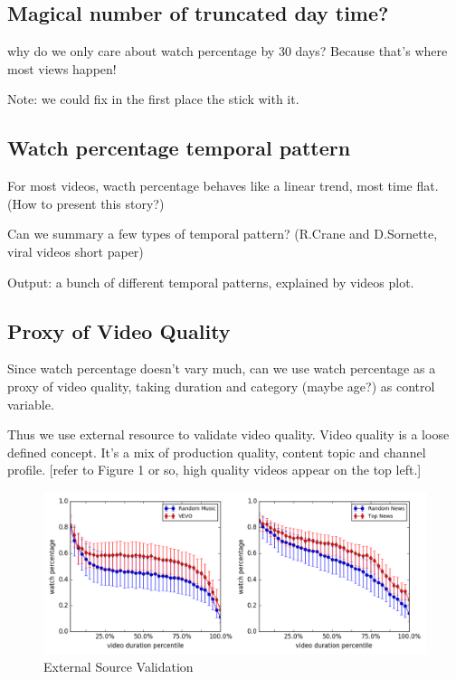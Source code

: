 \subsection{Magical number of truncated day time?}
why do we only care about watch percentage by 30 days? Because that's where most views happen!

Note: we could fix in the first place the stick with it.


\subsection{Watch percentage temporal pattern}

For most videos, wacth percentage behaves like a linear trend, most time flat. (How to present this story?)

Can we summary a few types of temporal pattern? (R.Crane and D.Sornette, viral videos short paper)

Output: a bunch of different temporal patterns, explained by videos plot.


\subsection{Proxy of Video Quality}
Since watch percentage doesn't vary much, can we use watch percentage as a proxy of video quality, taking duration and category (maybe age?) as control variable.

Thus we use external resource to validate video quality. Video quality is a loose defined concept. It's a mix of production quality, content topic and channel profile. [refer to Figure 1 or so, high quality videos appear on the top left.]

\begin{figure}
    \centering
    \includegraphics[scale=0.32]{image/external_source_comp.png}
    \caption{External Source Validation}
\end{figure}

